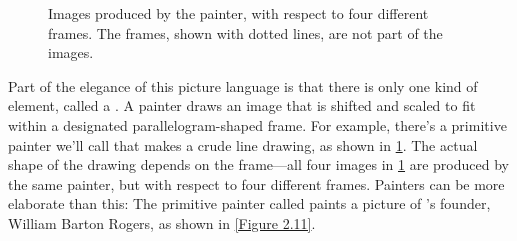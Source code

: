 \begin{figure}[tb]
	\centering
	
	\caption{
		Images produced by the  painter, with respect to four different frames.
		The frames, shown with dotted lines, are not part of the images.
	}
	\label{Figure 2.10}
\end{figure}

Part of the elegance of this picture language is that there is only one kind of element, called a .
A painter draws an image that is shifted and scaled to fit within a designated parallelogram-shaped frame.
For example, there’s a primitive painter we’ll call  that makes a crude line drawing, as shown in \cref{Figure 2.10}.
The actual shape of the drawing depends on the frame---all four images in \cref{Figure 2.10} are produced by the same  painter, but with respect to four different frames.
Painters can be more elaborate than this:
The primitive painter called  paints a picture of ’s founder, William Barton Rogers, as shown in \cref{Figure 2.11}.%
